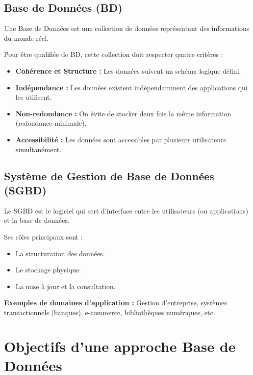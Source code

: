 \subsection{Base de Données (BD)}

\begin{definition}
Une Base de Données est une collection de données représentant des informations du monde réel.
\end{definition}

Pour être qualifiée de BD, cette collection doit respecter quatre critères :

\begin{itemize}
\item \textbf{Cohérence et Structure :} Les données suivent un schéma logique défini.
\item \textbf{Indépendance :} Les données existent indépendamment des applications qui les utilisent.
\item \textbf{Non-redondance :} On évite de stocker deux fois la même information (redondance minimale).
\item \textbf{Accessibilité :} Les données sont accessibles par plusieurs utilisateurs simultanément.
\end{itemize}

\subsection{Système de Gestion de Base de Données (SGBD)}

\begin{definition}
Le SGBD est le logiciel qui sert d'interface entre les utilisateurs (ou applications) et la base de données.
\end{definition}

Ses rôles principaux sont :

\begin{itemize}
\item La structuration des données.
\item Le stockage physique.
\item La mise à jour et la consultation.
\end{itemize}

\textbf{Exemples de domaines d'application :} Gestion d'entreprise, systèmes transactionnels (banques), e-commerce, bibliothèques numériques, etc.

\section{Objectifs d'une approche Base de Données}

